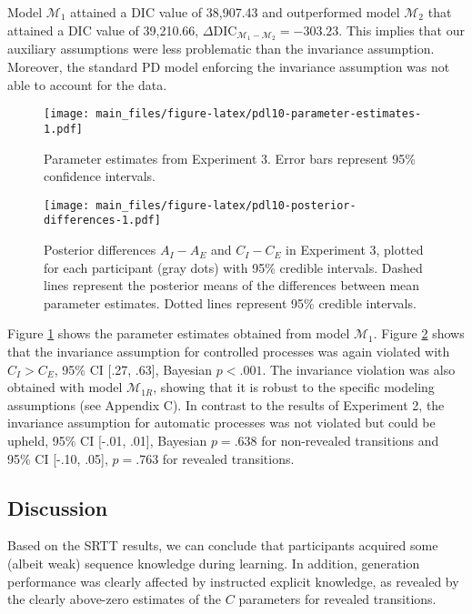 \documentclass[man]{apa6}
\theoremstyle{definition}
\theoremstyle{definition}
\theoremstyle{definition}
\theoremstyle{remark}
\begin{document}
Model \(\mathcal{M}_1\) attained a DIC value of 38,907.43 and
outperformed model \(\mathcal{M}_2\) that attained a DIC value of
39,210.66,
\(\Delta \textrm{DIC}_{\mathcal{M}_1 - \mathcal{M}_2} = -303.23\). This
implies that our auxiliary assumptions were less problematic than the
invariance assumption. Moreover, the standard PD model enforcing the
invariance assumption was not able to account for the data.

\begin{figure}
\centering
\texttt{[image: main\_files/figure-latex/pdl10-parameter-estimates-1.pdf]}
\caption{\label{fig:pdl10-parameter-estimates}Parameter estimates from
Experiment 3. Error bars represent 95\% confidence intervals.}
\end{figure}

\begin{figure}
\centering
\texttt{[image: main\_files/figure-latex/pdl10-posterior-differences-1.pdf]}
\caption{\label{fig:pdl10-posterior-differences}Posterior differences
\(A_I - A_E\) and \(C_I - C_E\) in Experiment 3, plotted for each
participant (gray dots) with 95\% credible intervals. Dashed lines
represent the posterior means of the differences between mean parameter
estimates. Dotted lines represent 95\% credible intervals.}
\end{figure}

Figure \ref{fig:pdl10-parameter-estimates} shows the parameter estimates
obtained from model \(\mathcal{M}_1\). Figure
\ref{fig:pdl10-posterior-differences} shows that the invariance
assumption for controlled processes was again violated with
\(C_I > C_E\), 95\% CI {[}.27, .63{]}, Bayesian \(p < .001\). The
invariance violation was also obtained with model \(\mathcal{M}_{1R}\),
showing that it is robust to the specific modeling assumptions (see
Appendix C). In contrast to the results of Experiment 2, the invariance
assumption for automatic processes was not violated but could be upheld,
95\% CI {[}-.01, .01{]}, Bayesian \(p = .638\) for non-revealed
transitions and 95\% CI {[}-.10, .05{]}, \(p = .763\) for revealed
transitions.

\subsection{Discussion}\label{discussion-2}

Based on the SRTT results, we can conclude that participants acquired
some (albeit weak) sequence knowledge during learning. In addition,
generation performance was clearly affected by instructed explicit
knowledge, as revealed by the clearly above-zero estimates of the \(C\)
parameters for revealed transitions.
\end{document}
